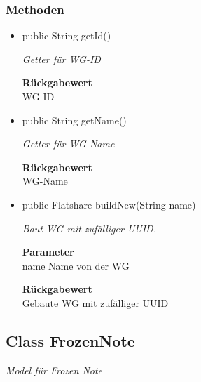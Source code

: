 \documentclass[a4paper]{scrreprt}
\begin{document}
    \subsubsection{Methoden}
    \begin{itemize}
    	\item{public String getId()}
    	
    	\textit{Getter für WG-ID}
    	
    	
    	
    	\textbf{Rückgabewert} \\
    	WG-ID        \item{public String getName()}
    	
    	\textit{Getter für WG-Name}
    	
    	
    	
    	\textbf{Rückgabewert} \\
    	WG-Name        \item{public Flatshare buildNew(String name)}
    	
    	\textit{Baut WG mit zufälliger UUID.}
    	
    	\textbf{Parameter} \\
    	name Name von der WG
    	
    	\textbf{Rückgabewert} \\
    	Gebaute WG mit zufälliger UUID
    \end{itemize}
    \subsection{Class FrozenNote}
    \textit{Model für Frozen Note}
\end{document}
